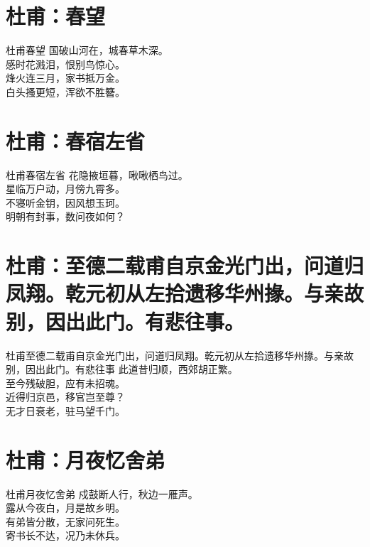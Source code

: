 \documentclass[12pt,oneside,a5paper]{book}
\begin{document}
\chapter{杜甫：春望}
\begin{poemzh}{杜甫}{春望}
国破山河在，城春草木深。\\
感时花溅泪，恨别鸟惊心。\\
烽火连三月，家书抵万金。\\
白头搔更短，浑欲不胜簪。\\ 
\end{poemzh}

\chapter{杜甫：春宿左省}
\begin{poemzh}{杜甫}{春宿左省}
花隐掖垣暮，啾啾栖鸟过。\\
星临万户动，月傍九霄多。\\
不寝听金钥，因风想玉珂。\\
明朝有封事，数问夜如何？\\ 
\end{poemzh}

\chapter{杜甫：至德二载甫自京金光门出，问道归凤翔。乾元初从左拾遗移华州掾。与亲故别，因出此门。有悲往事。}

\begin{poemzh}{杜甫}{至德二载甫自京金光门出，问道归凤翔。乾元初从左拾遗移华州掾。与亲故别，因出此门。有悲往事}
此道昔归顺，西郊胡正繁。\\
至今残破胆，应有未招魂。\\
近得归京邑，移官岂至尊？\\
无才日衰老，驻马望千门。\\ 
\end{poemzh}


\chapter{杜甫：月夜忆舍弟}
\begin{poemzh}{杜甫}{月夜忆舍弟}
戍鼓断人行，秋边一雁声。\\
露从今夜白，月是故乡明。\\
有弟皆分散，无家问死生。\\
寄书长不达，况乃未休兵。\\ 
\end{poemzh}
\end{document}
